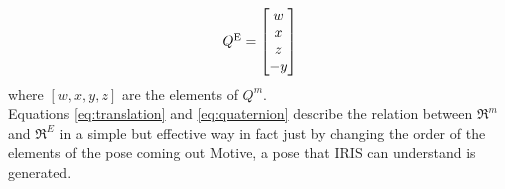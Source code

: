 \begin{equation}
Q\textsuperscript{E} = \begin{bmatrix}
w\\x\\z\\-y
\end{bmatrix}
\label{eq:quaternion}
\end{equation}
where $[w, x, y, z]$ are the elements of $Q^m$.\\

\noindent
Equations \ref{eq:translation} and \ref{eq:quaternion} describe the relation between $\Re^m$ and  $\Re^E$ in a simple but effective way in fact just by changing the order of the elements of the pose coming out Motive, a pose that IRIS can understand is generated. 
    
